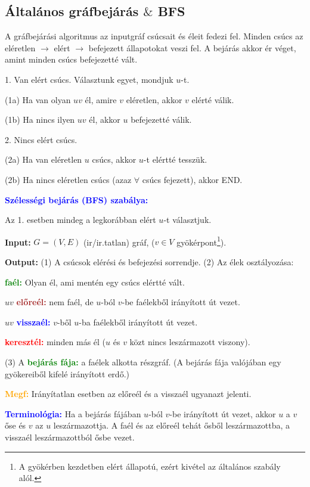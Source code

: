 \documentclass[../szamtud.tex]{subfiles}
\begin{document}
\subsection{Általános gráfbejárás $\&$ BFS}

			A gráfbejárási algoritmus az inputgráf csúcsait és éleit fedezi fel. Minden csúcs az eléretlen $\rightarrow$ elért $\rightarrow$ befejezett állapotokat veszi fel. A bejárás akkor ér véget, amint minden csúcs befejezetté vált. 

			1. Van elért csúcs. Választunk egyet, mondjuk $u$-t.
				
			(1a) Ha van olyan $uv$ él, amire $v$ eléretlen, akkor $v$ elérté válik.

			(1b) Ha nincs ilyen $uv$ él, akkor $u$ befejezetté válik.

			2. Nincs elért csúcs.

			(2a) Ha van eléretlen $u$ csúcs, akkor $u$-t elértté tesszük.

			(2b) Ha nincs eléretlen csúcs (azaz $\forall$ csúcs fejezett), akkor END.

			\textbf{\textcolor{blue}{Szélességi bejárás (BFS) szabálya:}}

			Az 1. esetben mindeg a legkorábban elért $u$-t választjuk.

			\textbf{Input:} $G = (V,E)$ (ir/ir.tatlan) gráf, ($v \in V$ gyökérpont\footnote{A gyökérben kezdetben elért állapotú, ezért kivétel az általános szabály alól.}).

			\textbf{Output:} (1) A csúcsok elérési és befejezési sorrendje. (2) Az élek osztályozása:

			\textbf{\textcolor{green}{faél:}} Olyan él, ami mentén egy csúcs elértté vált.

			$uv$ \textbf{\textcolor{brown}{előreél:}} nem faél, de $u$-ból $v$-be faélekből irányított út vezet.

			$uv$ \textbf{\textcolor{blue}{visszaél:}} $v$-ből $u$-ba faélekből irányított út vezet.

			\textbf{\textcolor{red}{keresztél:}} minden más él ($u$ és $v$ közt nincs leszármazott viszony).

			(3) A \textbf{\textcolor{green}{bejárás fája:}} a faélek alkotta részgráf. (A bejárás fája valójában egy gyökereiből kifelé irányított erdő.)

			\textbf{\textcolor{orange}{Megf:}} Irányítatlan esetben az előreél és a visszaél ugyanazt jelenti.

			\textbf{\textcolor{blue}{Terminológia:}} Ha a bejárás fájában $u$-ból $v$-be irányított út vezet, akkor $u$ a $v$ őse és $v$ az $u$ leszármazottja. A faél és az előreél tehát ősből leszármazottba, a visszaél leszármazottból ősbe vezet.
\end{document}
